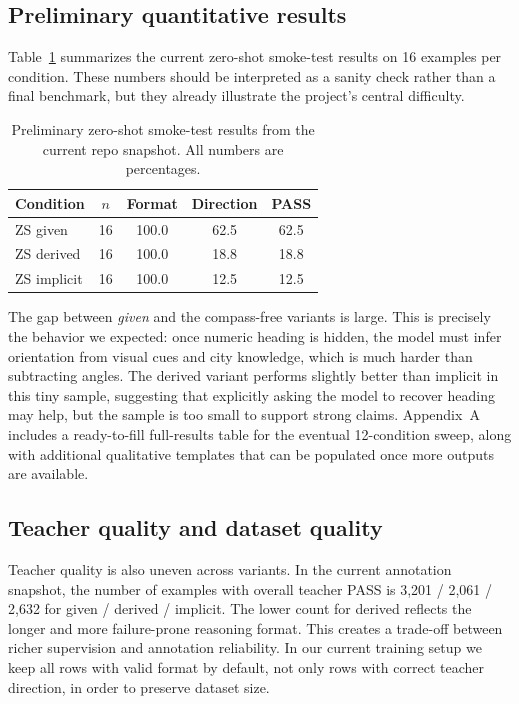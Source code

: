 \documentclass[10pt,twocolumn,letterpaper]{article}
\begin{document}
\subsection{Preliminary quantitative results}
Table~\ref{tab:zs} summarizes the current zero-shot smoke-test results on 16 examples per condition. These numbers should be interpreted as a sanity check rather than a final benchmark, but they already illustrate the project's central difficulty.

\begin{table}[t]
\centering
\small
\begin{tabular}{lcccc}
\toprule
Condition & $n$ & Format & Direction & PASS \\
\midrule
ZS given & 16 & 100.0 & 62.5 & 62.5 \\
ZS derived & 16 & 100.0 & 18.8 & 18.8 \\
ZS implicit & 16 & 100.0 & 12.5 & 12.5 \\
\bottomrule
\end{tabular}
\caption{Preliminary zero-shot smoke-test results from the current repo snapshot. All numbers are percentages.}
\label{tab:zs}
\end{table}

The gap between \textit{given} and the compass-free variants is large. This is precisely the behavior we expected: once numeric heading is hidden, the model must infer orientation from visual cues and city knowledge, which is much harder than subtracting angles. The derived variant performs slightly better than implicit in this tiny sample, suggesting that explicitly asking the model to recover heading may help, but the sample is too small to support strong claims.
Appendix~A includes a ready-to-fill full-results table for the eventual 12-condition sweep, along with additional qualitative templates that can be populated once more outputs are available.

\subsection{Teacher quality and dataset quality}
Teacher quality is also uneven across variants. In the current annotation snapshot, the number of examples with overall teacher PASS is 3,201 / 2,061 / 2,632 for given / derived / implicit. The lower count for derived reflects the longer and more failure-prone reasoning format. This creates a trade-off between richer supervision and annotation reliability. In our current training setup we keep all rows with valid format by default, not only rows with correct teacher direction, in order to preserve dataset size.
\end{document}
